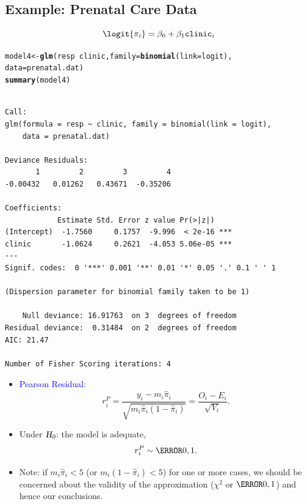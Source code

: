 \documentclass{article}\usepackage[]{graphicx}\usepackage[svgnames]{xcolor}
\makeatletter
\newcommand{\hlopt}[1]{\textcolor[rgb]{0,0,0}{#1}}%
\newcommand{\hlstd}[1]{\textcolor[rgb]{0.345,0.345,0.345}{#1}}%
\newcommand{\hlkwb}[1]{\textcolor[rgb]{0.69,0.353,0.396}{#1}}%
\newcommand{\hlkwc}[1]{\textcolor[rgb]{0.333,0.667,0.333}{#1}}%
\newcommand{\hlkwd}[1]{\textcolor[rgb]{0.737,0.353,0.396}{\textbf{#1}}}%
\newenvironment{kframe}{%
 \def\at@end@of@kframe{}%
 \ifinner\ifhmode%
  \def\at@end@of@kframe{\end{minipage}}%
  \begin{minipage}{\columnwidth}%
 \fi\fi%
 \def\FrameCommand##1{\hskip\@totalleftmargin \hskip-\fboxsep
 \colorbox{shadecolor}{##1}\hskip-\fboxsep
     \hskip-\linewidth \hskip-\@totalleftmargin \hskip\columnwidth}%
 \MakeFramed {\advance\hsize-\width
   \@totalleftmargin\z@ \linewidth\hsize
   \@setminipage}}%
 {\par\unskip\endMakeFramed%
 \at@end@of@kframe}
\newenvironment{knitrout}{}{} %
\newcommand{\HN}{\textsl{H}_{\textsl{0}}}%
\makeatother
\begin{document}
\subsection*{Example: Prenatal Care Data}
\[ \logit{\pi_i}=\beta_0+\beta_1\texttt{clinic}_i \]
\begin{knitrout}
\color{fgcolor}\begin{kframe}
\begin{alltt}
\hlstd{model4} \hlkwb{<-} \hlkwd{glm}\hlstd{(resp} \hlopt{~} \hlstd{clinic,} \hlkwc{family} \hlstd{=} \hlkwd{binomial}\hlstd{(}\hlkwc{link} \hlstd{= logit),}
  \hlkwc{data} \hlstd{= prenatal.dat)}
\hlkwd{summary}\hlstd{(model4)}
\end{alltt}
\begin{verbatim}

Call:
glm(formula = resp ~ clinic, family = binomial(link = logit), 
    data = prenatal.dat)

Deviance Residuals: 
       1         2         3         4  
-0.00432   0.01262   0.43671  -0.35206  

Coefficients:
            Estimate Std. Error z value Pr(>|z|)    
(Intercept)  -1.7560     0.1757  -9.996  < 2e-16 ***
clinic       -1.0624     0.2621  -4.053 5.06e-05 ***
---
Signif. codes:  0 '***' 0.001 '**' 0.01 '*' 0.05 '.' 0.1 ' ' 1

(Dispersion parameter for binomial family taken to be 1)

    Null deviance: 16.91763  on 3  degrees of freedom
Residual deviance:  0.31484  on 2  degrees of freedom
AIC: 21.47

Number of Fisher Scoring iterations: 4
\end{verbatim}
\end{kframe}
\end{knitrout}
\begin{itemize}
    \item \textcolor{Blue}{Pearson Residual}:
          \[ r_i^P=\frac{y_i-m_i\hat{\pi}_i}{\sqrt{m_i\hat{\pi}_i(1-\hat{\pi}_i)}}=\frac{O_i-E_i}{\sqrt{V_i}}.  \]
    \item Under $ \HN $: the model is adequate,
          \[ r_i^P \sim \N{0,1}. \]
    \item Note: if $ m_i\hat{\pi}_i<5 $ (or $ m_i(1-\hat{\pi}_i)<5 $) for one or more cases, we should be concerned about
          the validity of the approximation ($ \chi^2 $ or $ \N{0,1} $) and hence our conclusions.
\end{itemize}
\end{document}
